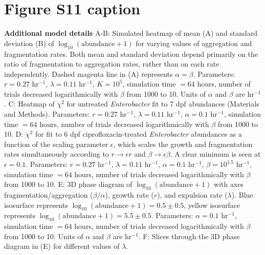 \documentclass[12pt]{article}
\begin{document}
\section*{Figure S11 caption}
\textbf{Additional model details}  A-B: Simulated heatmap of mean (A) and standard deviation (B) of $\log_{10}(\text{abundance} + 1)$ for varying values of aggregation and fragmentation rates. Both mean and standard deviation depend primarily on the ratio of fragmentation to aggregation rates, rather than on each rate independently. Dashed magenta line in (A) represents $\alpha = \beta$. Parameters: $r = 0.27$ hr$^{-1}$, $\lambda = 0.11$ hr$^{-1}$, $K = 10^5$, simulation time $= 64$ hours, number of trials decreased logarithmically with $\beta$ from 1000 to 10. Units of $\alpha$ and $\beta$ are hr$^{-1}$.  C: Heatmap of $\chi^2$ for untreated \textit{Enterobacter} fit to 7 dpf abundances (Materials and Methods). Parameters: $r = 0.27$ hr$^{-1}$, $\lambda = 0.11$ hr$^{-1}$, $\alpha = 0.1$ hr$^{-1}$, simulation time $= 64$ hours, number of trials decreased logarithmically with $\beta$ from 1000 to 10. D:   $\chi^2$ for fit to 6 dpf ciprofloxacin-treated \textit{Enterobacter} abundances as a function of the scaling parameter $\epsilon$, which scales the growth and fragmentation rates simultaneously according to $r \to \epsilon r$ and $\beta \to \epsilon \beta$. A clear minimum is seen at $\epsilon = 0.1$. Parameters: $r = 0.27$ hr$^{-1}$, $\lambda = 0.11$ hr$^{-1}$, $\alpha = 0.1$ hr$^{-1}$, $\beta = 10^{1.5}$ hr$^{-1}$, simulation time $= 64$ hours, number of trials decreased logarithmically with $\beta$ from 1000 to 10. E: 3D phase diagram of $\log_{10}(\text{abundance} + 1)$ with axes fragmentation/aggregation ($\beta/\alpha$), growth rate ($r$), and expulsion rate ($\lambda$). Blue isosurface represents $\log_{10}(\text{abundance} + 1) = 0.5 \pm 0.5$, yellow isosurface represents  $\log_{10}(\text{abundance} + 1) = 5.5 \pm 0.5$. Parameters: $\alpha = 0.1$ hr$^{-1}$, simulation time $= 64$ hours, number of trials decreased logarithmically with $\beta$ from 1000 to 10. Units of $\alpha$ and $\beta$ are hr$^{-1}$. F: Slices through the 3D phase diagram in (E) for different values of $\lambda$.
\end{document}
